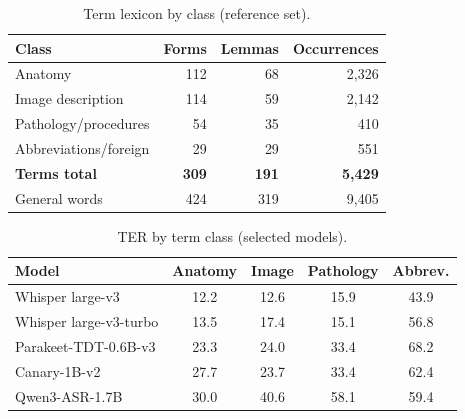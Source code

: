 \documentclass[conference]{IEEEtran}
\begin{document}
\begin{table}[t]
\centering
\caption{Cloud services: radiology terminology (same columns as Table~\ref{tab:ter-open}).}
\label{tab:ter-cloud}
\end{table}

\begin{table}[t]
\centering
\caption{Term lexicon by class (reference set).}
\label{tab:lex}
\begin{tabular}{lrrr}
\toprule
Class & Forms & Lemmas & Occurrences \\
\midrule
Anatomy & 112 & 68 & 2,326 \\
Image description & 114 & 59 & 2,142 \\
Pathology/procedures & 54 & 35 & 410 \\
Abbreviations/foreign & 29 & 29 & 551 \\
\textbf{Terms total} & \textbf{309} & \textbf{191} & \textbf{5,429} \\
General words & 424 & 319 & 9,405 \\
\bottomrule
\end{tabular}
\end{table}

\begin{table}[t]
\centering
\caption{TER by term class (selected models).}
\label{tab:class}
\begin{tabular}{lcccc}
\toprule
Model & Anatomy & Image & Pathology & Abbrev. \\
\midrule
Whisper large-v3 & 12.2 & 12.6 & 15.9 & 43.9 \\
Whisper large-v3-turbo & 13.5 & 17.4 & 15.1 & 56.8 \\
Parakeet-TDT-0.6B-v3 & 23.3 & 24.0 & 33.4 & 68.2 \\
Canary-1B-v2 & 27.7 & 23.7 & 33.4 & 62.4 \\
Qwen3-ASR-1.7B & 30.0 & 40.6 & 58.1 & 59.4 \\
\bottomrule
\end{tabular}
\end{table}
\end{document}
